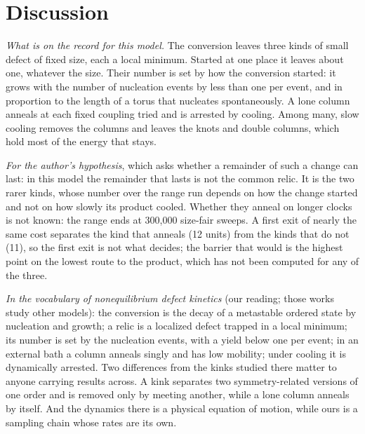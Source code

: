 \documentclass[aps,pre,10pt,twocolumn,superscriptaddress,nofootinbib]{revtex4-2}
\begin{document}
\section{Discussion}
\label{sec:discussion}

\emph{What is on the record for this model.} The conversion leaves three kinds of small defect of fixed size,
each a local minimum. Started at one place it leaves about one, whatever the size. Their number is set by how
the conversion started: it grows with the number of nucleation events by less than one per event, and in
proportion to the length of a torus that nucleates spontaneously. A lone column anneals at each fixed coupling
tried and is arrested by cooling. Among many, slow cooling removes the columns and leaves the knots and double
columns, which hold most of the energy that stays.

\emph{For the author's hypothesis}, which asks whether a remainder of such a change can last: in this model
the remainder that lasts is not the common relic. It is the two rarer kinds, whose number over the range run
depends on how the change started and not on how slowly its product cooled. Whether they anneal on longer
clocks is not known: the range ends at 300,000 size-fair sweeps. A first exit of nearly the same cost separates
the kind that anneals (12 units) from the kinds that do not (11), so the first exit is not what decides; the
barrier that would is the highest point on the lowest route to the product, which has not been computed for
any of the three.

\emph{In the vocabulary of nonequilibrium defect kinetics} \cite{JC26,JYC25,FZC26} (our reading; those works
study other models): the conversion is the decay of a metastable ordered state by nucleation and growth; a
relic is a localized defect trapped in a local minimum; its number is set by the nucleation events, with a
yield below one per event; in an external bath a column anneals singly and has low mobility; under cooling it
is dynamically arrested. Two differences from the kinks studied there matter to anyone carrying results
across. A kink separates two symmetry-related versions of one order and is removed only by meeting another,
while a lone column anneals by itself. And the dynamics there is a physical equation of motion, while ours is
a sampling chain whose rates are its own.
\end{document}
